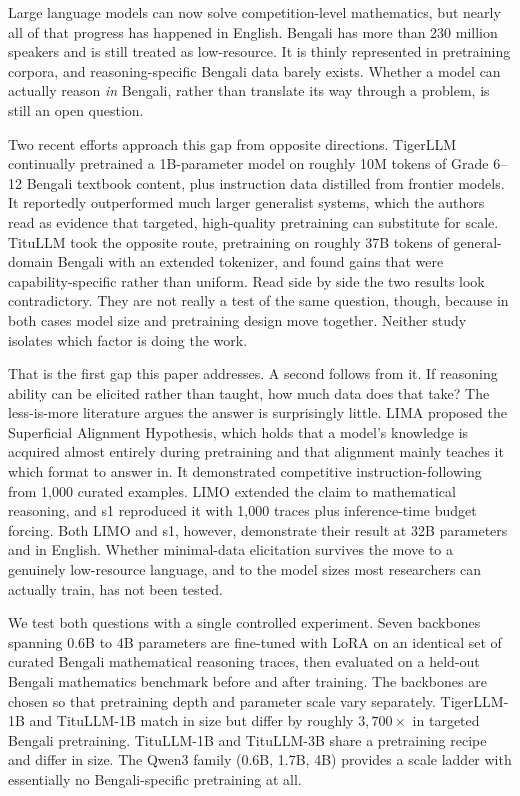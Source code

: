 \documentclass[10pt,twocolumn,letterpaper]{article}
\begin{document}
Large language models can now solve competition-level mathematics, but nearly
all of that progress has happened in English. Bengali has more than 230 million
speakers and is still treated as low-resource. It is thinly represented in
pretraining corpora, and reasoning-specific Bengali data barely exists. Whether
a model can actually reason \emph{in} Bengali, rather than translate its way
through a problem, is still an open question.

Two recent efforts approach this gap from opposite directions. TigerLLM
\parencite{raihan2025tigerllm} continually pretrained a 1B-parameter model on
roughly 10M tokens of Grade 6--12 Bengali textbook content, plus instruction
data distilled from frontier models. It reportedly outperformed much larger
generalist systems, which the authors read as evidence that targeted,
high-quality pretraining can substitute for scale. TituLLM
\parencite{nahin2025titullm} took the opposite route, pretraining on roughly 37B
tokens of general-domain Bengali with an extended tokenizer, and found gains
that were capability-specific rather than uniform. Read side by side the two
results look contradictory. They are not really a test of the same question,
though, because in both cases model size and pretraining design move together.
Neither study isolates which factor is doing the work.

That is the first gap this paper addresses. A second follows from it. If
reasoning ability can be elicited rather than taught, how much data does that
take? The less-is-more literature argues the answer is surprisingly little. LIMA
\parencite{zhou2023lima} %
proposed the Superficial Alignment Hypothesis, which holds that a model's
knowledge is acquired almost entirely during pretraining and that alignment
mainly teaches it which format to answer in. It demonstrated competitive
instruction-following from 1,000 curated examples. LIMO \parencite{ye2025limo}
extended the claim to mathematical reasoning, and s1
\parencite{muennighoff2025s1} reproduced it with 1,000 traces plus
inference-time budget forcing. Both LIMO and s1, however, demonstrate their
result at 32B parameters and in English. Whether minimal-data elicitation
survives the move to a genuinely low-resource language, and to the model sizes
most researchers can actually train, has not been tested.

We test both questions with a single controlled experiment. Seven backbones
spanning 0.6B to 4B parameters are fine-tuned with LoRA on an identical set of
curated Bengali mathematical reasoning traces, then evaluated on a held-out
Bengali mathematics benchmark before and after training. The backbones are
chosen so that pretraining depth and parameter scale vary separately.
TigerLLM-1B and TituLLM-1B match in size but differ by roughly $3{,}700\times$
in targeted Bengali pretraining. TituLLM-1B and TituLLM-3B share a pretraining
recipe and differ in size. The Qwen3 family (0.6B, 1.7B, 4B) provides a scale
ladder with essentially no Bengali-specific pretraining at all.
\end{document}
